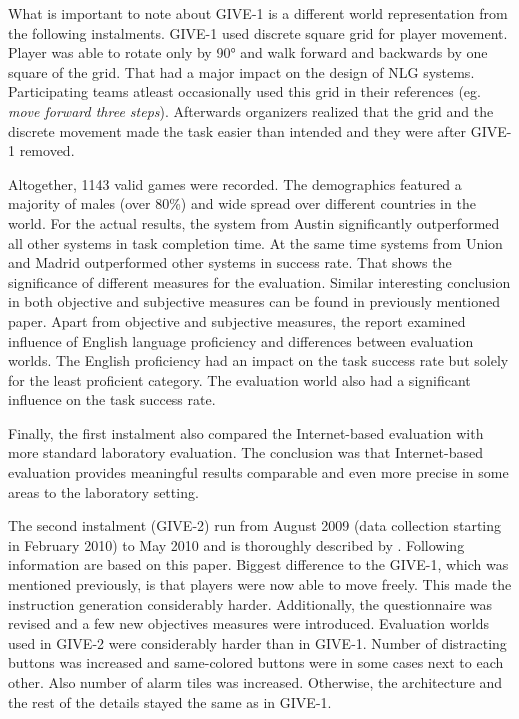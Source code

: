 What is important to note about GIVE-1 is a different world representation from the following instalments. GIVE-1 used discrete square grid for player movement. Player was able to rotate only by 90° and walk forward and backwards by one square of the grid. That had a major impact on the design of NLG systems. Participating teams atleast occasionally used this grid in their references (eg. \textit{move forward three steps}). Afterwards organizers realized that the grid and the discrete movement made the task easier than intended and they were after GIVE-1 removed.

Altogether, 1143 valid games were recorded. The demographics featured a majority of males (over 80\%) and wide spread over different countries in the world. For the actual results,  the system from Austin significantly outperformed all other systems in task completion time. At the same time systems from Union and Madrid outperformed other systems in success rate. That shows the significance of different measures for the evaluation. Similar interesting conclusion in both objective and subjective measures can be found in previously mentioned paper. Apart from objective and subjective measures, the report examined influence of English language proficiency and differences between evaluation worlds. The English proficiency had an impact on the task success rate but solely for the least proficient category. The evaluation world also had a significant influence on the task success rate.

Finally, the first instalment also compared the Internet-based evaluation with more standard laboratory evaluation. The conclusion was that Internet-based evaluation provides meaningful results comparable and even more precise in some areas to the laboratory setting.

The second instalment (GIVE-2) run from August 2009 (data collection starting in February 2010) to May 2010 and is thoroughly described by \citet{koller2010report}. Following information are based on this paper. Biggest difference to the GIVE-1, which was mentioned previously, is that players were now able to move freely. This made the instruction generation considerably harder. Additionally, the questionnaire was revised and a few new objectives measures were introduced. Evaluation worlds used in GIVE-2 were considerably harder than in GIVE-1. Number of distracting buttons was increased and same-colored buttons were in some cases next to each other. Also number of alarm tiles was increased. Otherwise, the architecture and the rest of the details stayed the same as in GIVE-1.

